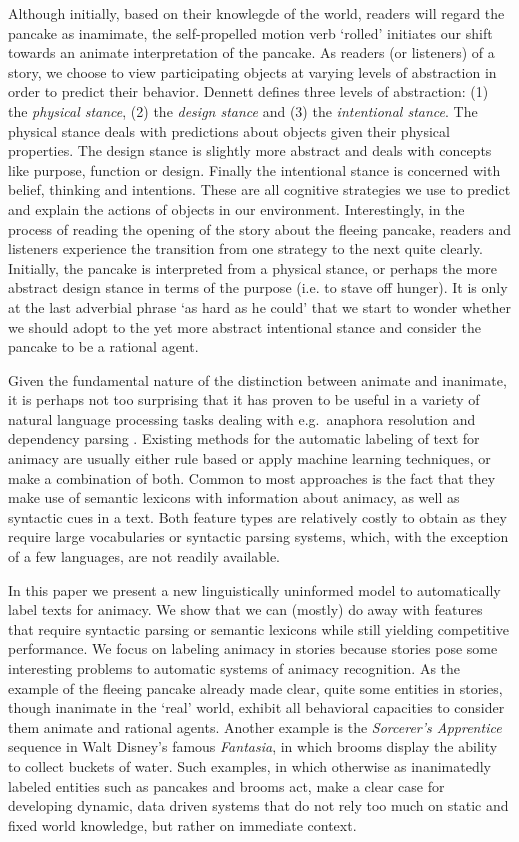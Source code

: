 \documentclass[a4paper,UKenglish]{oasics}
\begin{document}
Although initially, based on their knowlegde of the world, readers
will regard the pancake as inamimate, the self-propelled motion verb
`rolled' initiates our shift towards an animate interpretation of the
pancake. As readers (or listeners) of a story, we choose to view
participating objects at varying levels of abstraction in order to
predict their behavior. Dennett \cite{dennett:96} defines three levels
of abstraction: (1) the \textit{physical stance}, (2) the
\textit{design stance} and (3) the \textit{intentional stance}. The
physical stance deals with predictions about objects given their
physical properties. The design stance is slightly more abstract and
deals with concepts like purpose, function or design. Finally the
intentional stance is concerned with belief, thinking and
intentions. These are all cognitive strategies we use to predict and
explain the actions of objects in our environment. Interestingly, in
the process of reading the opening of the story about the fleeing
pancake, readers and listeners experience the transition from one
strategy to the next quite clearly. Initially, the pancake is
interpreted from a physical stance, or perhaps the more abstract
design stance in terms of the purpose (i.e. to stave off hunger). It
is only at the last adverbial phrase `as hard as he could' that we
start to wonder whether we should adopt to the yet more abstract
intentional stance and consider the pancake to be a rational agent.

Given the fundamental nature of the distinction between animate and
inanimate, it is perhaps not too surprising that it has proven to be
useful in a variety of natural language processing tasks dealing with
e.g.\ anaphora resolution and dependency parsing
\cite{orasan:07,lee:13,ovr:niv:07}. Existing methods for the automatic
labeling of text for animacy are usually either rule based or apply
machine learning techniques, or make a combination of both. Common to
most approaches is the fact that they make use of semantic lexicons
with information about animacy, as well as syntactic cues in a
text. Both feature types are relatively costly to obtain as they
require large vocabularies or syntactic parsing systems, which, with
the exception of a few languages, are not readily available.

In this paper we present a new linguistically uninformed model to
automatically label texts for animacy. We show that we can (mostly) do
away with features that require syntactic parsing or semantic lexicons
while still yielding competitive performance. We focus on labeling
animacy in stories because stories pose some interesting problems to
automatic systems of animacy recognition. As the example of the
fleeing pancake already made clear, quite some entities in stories,
though inanimate in the `real' world, exhibit all behavioral
capacities to consider them animate and rational agents. Another
example is the \textit{Sorcerer's Apprentice} sequence in Walt
Disney's famous \textit{Fantasia}, in which brooms display the ability
to collect buckets of water. Such examples, in which otherwise as
inanimatedly labeled entities such as pancakes and brooms act, make a
clear case for developing dynamic, data driven systems that do not
rely too much on static and fixed world knowledge, but rather on
immediate context.
\end{document}
